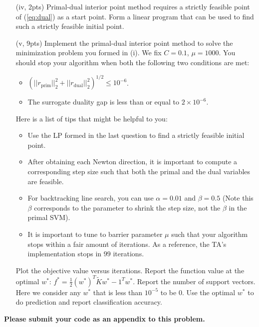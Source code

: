 \documentclass{article}
\theoremstyle{remark}
\theoremstyle{definition}
\begin{document}
\begin{enumerate}[(a)]
\begin{enumerate}[(i)]
\item[(iv, 2pts)]   Primal-dual interior point method requires a strictly feasible point of (\ref{eq:dual}) as a start point. Form a linear program that can be used to find such a strictly feasible initial point. 
\item[(v, 9pts)]   Implement the primal-dual interior point method to solve the minimization problem you formed in (i). We fix $C = 0.1$, $\mu = 1000$. You should stop your algorithm when both the following two conditions are met:
    \begin{itemize}
      \item   $(||r_{\text{prim}}||_2^2 + ||r_{\text{dual}}||_2^2)^{1/2}\leq 10^{-6}$.
      \item   The surrogate duality gap is less than or equal to $2\times 10^{-6}$.
    \end{itemize}
  Here is a list of tips that might be helpful to you:
  \begin{itemize}
      \item   Use the LP formed in the last question to find a strictly feasible initial point.
      \item   After obtaining each Newton direction, it is important to compute a corresponding step size such that both the primal and the dual variables are feasible. 
      \item   For backtracking line search, you can use $\alpha = 0.01$ and $\beta = 0.5$ (Note this $\beta$ corresponds to the parameter to shrink the step size, not the $\beta$ in the primal SVM).
      \item   It is important to tune to barrier parameter $\mu$ such that your algorithm stops within a fair amount of iterations. As a reference, the TA's implementation stops in $99$ iterations.
  \end{itemize}
  Plot the objective value versus iterations.
  Report the function value at the optimal $w^*$: $f^* = \frac{1}{2}(w^*)^T\tilde{K}w^* - 1^Tw^*$. Report the number of support vectors. Here we consider any $w^*$ that is less than $10^{-5}$ to be $0$. Use the optimal $w^*$ to do prediction and report classification accuracy. 
  \end{enumerate}

\end{enumerate}

\textbf{Please submit your code as an appendix to this problem.}
\end{document}
